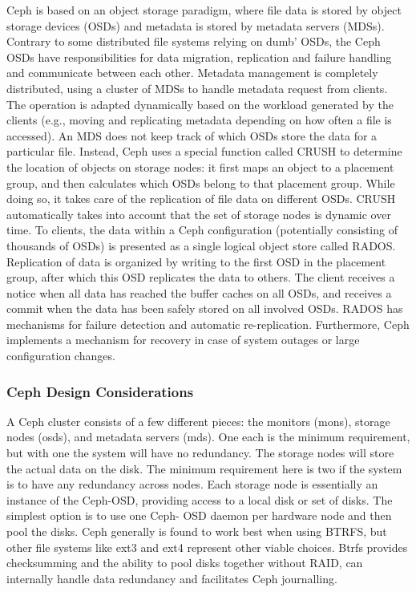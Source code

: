 \documentclass[11pt]{article}
\begin{document}
Ceph is based on an object storage paradigm, where file data is stored 
by object storage devices (OSDs) and metadata is stored by metadata 
servers (MDSs). Contrary to some distributed file systems relying on 
dumb’ OSDs, the Ceph OSDs have responsibilities for data migration, 
replication and failure handling and communicate between each other. 
Metadata management is completely distributed, using a cluster of MDSs 
to handle metadata request from clients. The operation is adapted 
dynamically based on the workload generated by the clients (e.g., moving 
and replicating metadata depending on how often a file is accessed).
An MDS does not keep track of which OSDs store the data for a particular 
file. Instead, Ceph uses a special function called CRUSH to determine the 
location of objects on storage nodes: it first maps an object to a 
placement group, and then calculates which OSDs belong to that placement 
group. While doing so, it takes care of the replication of file data on 
different OSDs. CRUSH automatically takes into account that the set of 
storage nodes is dynamic over time. To clients, the data within a Ceph 
configuration (potentially consisting of thousands of OSDs) is presented 
as a single logical object store called RADOS. Replication of data is 
organized by writing to the first OSD in the placement group, after which 
this OSD replicates the data to others. The client receives a notice when 
all data has reached the buffer caches on all OSDs, and receives a commit 
when the data has been safely stored on all involved OSDs. RADOS has 
mechanisms for failure detection and automatic re-replication. Furthermore, 
Ceph implements a mechanism for recovery in case of system outages or 
large configuration changes.

\subsubsection{Ceph Design Considerations}
A Ceph cluster consists of a few different pieces: the monitors (mons), 
storage nodes (osds), and metadata servers (mds). One each is the minimum 
requirement, but with one the system will have no redundancy. The storage 
nodes will store the actual data on the disk. The minimum requirement 
here is two if the system is to have any redundancy across nodes. Each 
storage node is essentially an instance of the Ceph-OSD, providing access 
to a local disk or set of disks. The simplest option is to use one Ceph-
OSD daemon per hardware node and then pool the disks. Ceph generally is 
found to work best when using BTRFS, but other file systems like ext3 and 
ext4 represent other viable choices. Btrfs provides checksumming and the 
ability to pool disks together without RAID, can internally handle data 
redundancy and facilitates Ceph journalling. 
\end{document}
